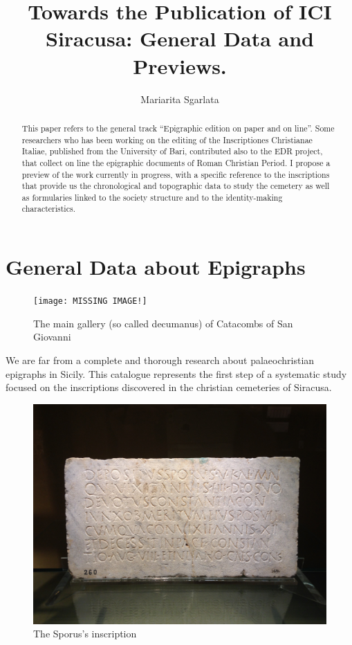 \documentclass[amsthm,ebook]{saparticle}
\title{Towards the Publication of ICI Siracusa: General Data and Previews.}
\author[unica]{Mariarita Sgarlata\corref{first}}
\begin{document}
\maketitle
\begin{abstract}
This paper refers to the general track “Epigraphic edition on paper and on line”. Some researchers who has been working on the editing of the Inscriptiones Christianae Italiae, published from the University of Bari, contributed also to the EDR project, that collect on line the epigraphic documents of Roman Christian Period. I propose a preview of the work currently in progress, with a specific reference to the inscriptions that provide us the chronological and topographic data to study the cemetery as well as formularies linked to the society structure and to the identity-making characteristics.
\end{abstract}

\section{General Data about Epigraphs}

\begin{figure}[hbp]
\centering
 \texttt{[image: MISSING IMAGE!]}
\caption{The main gallery (so called decumanus) of Catacombs of San Giovanni}
\label{fig:1}
\end{figure}

We are far from a complete and thorough research about palaeochristian epigraphs in Sicily. This catalogue represents the first step of a systematic study focused on the inscriptions discovered in the christian cemeteries of Siracusa.

\begin{figure}[hbp]
\centering
 \includegraphics[width=\columnwidth]{Sporus.JPG}
\caption{The Sporus’s inscription}
\label{fig:2}
\end{figure}
\end{document}
